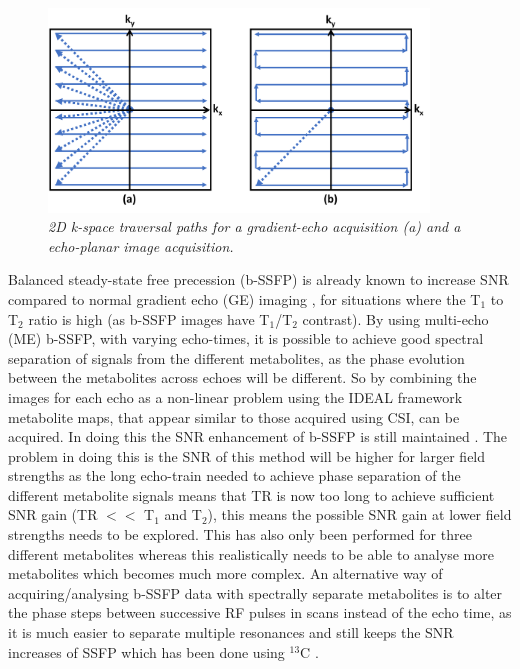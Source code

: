 \documentclass[class=article, crop=false]{standalone}
\begin{document}
\begin{figure}
    \centering
    \includegraphics[width=0.9\textwidth]{Figures/Theory/kspace.png}
    \caption{\textit{2D k-space traversal paths for a gradient-echo acquisition (a) and a echo-planar image acquisition.}}
    \label{fig:theory:kspace}
\end{figure}

Balanced steady-state free precession \cite{Carr1954EffectsExperiments} (b-SSFP) is already known to increase SNR compared to normal gradient echo (GE) imaging  \cite{Bieri2013FundamentalsMRI}, for situations where the T$_1$ to T$_2$ ratio is high (as b-SSFP images have T$_1$/T$_2$ contrast). By using multi-echo (ME) b-SSFP, with varying echo-times, it is possible to achieve good spectral separation of signals from the different metabolites, as the phase evolution between the metabolites across echoes will be different. So by combining the images for each echo as a non-linear problem using the IDEAL framework \cite{Reeder2007Water-fatImaging} metabolite maps, that appear similar to those acquired using CSI, can be acquired. In doing this the SNR enhancement of b-SSFP is still maintained \cite{Peters2021ImprovingInvestigation}. The problem in doing this is the SNR of this method will be higher for larger field strengths as the long echo-train needed to achieve phase separation of the different metabolite signals means that TR is now too long to achieve sufficient SNR gain (TR $<<$ T$_1$ and T$_2$), this means the possible SNR gain at lower field strengths needs to be explored. This has also only been performed for three different metabolites whereas this realistically needs to be able to analyse more metabolites which becomes much more complex. An alternative way of acquiring/analysing b-SSFP data with spectrally separate metabolites is to alter the phase steps between successive RF pulses in scans instead of the echo time, as it is much easier to separate multiple resonances and still keeps the SNR increases of SSFP which has been done using $^{13}$C \cite{Varma2016SelectiveSSFP}.
\end{document}
